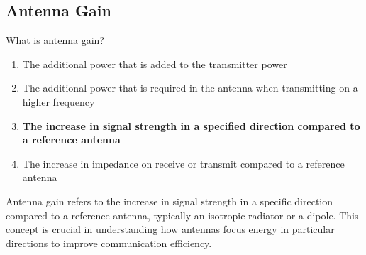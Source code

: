 \subsection{Antenna Gain}
\label{T9A11}

\begin{tcolorbox}[colback=gray!10!white,colframe=black!75!black,title=T9A11]
What is antenna gain?
\begin{enumerate}[noitemsep]
    \item The additional power that is added to the transmitter power
    \item The additional power that is required in the antenna when transmitting on a higher frequency
    \item \textbf{The increase in signal strength in a specified direction compared to a reference antenna}
    \item The increase in impedance on receive or transmit compared to a reference antenna
\end{enumerate}
\end{tcolorbox}

Antenna gain refers to the increase in signal strength in a specific direction compared to a reference antenna, typically an isotropic radiator or a dipole. This concept is crucial in understanding how antennas focus energy in particular directions to improve communication efficiency.
